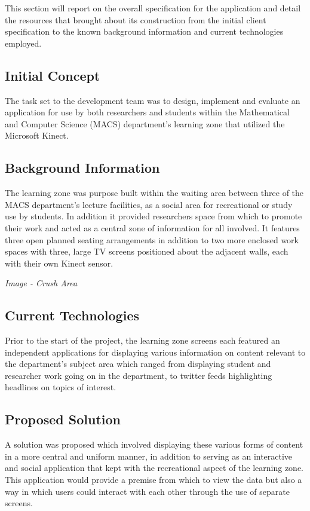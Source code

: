 This section will report on the overall specification for the application and detail the resources that brought about its construction from the initial client specification to the known background information and current technologies employed. 

\subsection{Initial Concept}
The task set to the development team was to design, implement and evaluate an application for use by both researchers and students within the Mathematical and Computer Science (MACS) department's learning zone that utilized the Microsoft Kinect.

\subsection{Background Information}
The learning zone was purpose built within the waiting area between three of the MACS department's lecture facilities, as a social area for recreational or study use by students. In addition it provided researchers space from which to promote their work and acted as a central zone of information for all involved. It features three open planned seating arrangements in addition to two more enclosed work spaces with three, large TV screens positioned about the adjacent walls, each with their own Kinect sensor. 

\begin{center}
\textit{Image - Crush Area}
\end{center}

\subsection{Current Technologies}
Prior to the start of the project, the learning zone screens each featured an independent applications for displaying various information on content relevant to the department's subject area which ranged from displaying student and researcher work going on in the department, to twitter feeds highlighting headlines on topics of interest.

\subsection{Proposed Solution} 
A solution was proposed which involved displaying these various forms of content in a more central and uniform manner, in addition to serving as an interactive and social application that kept with the recreational aspect of the learning zone. This application would provide a premise from which to view the data but also a way in which users could interact with each other through the use of separate screens.
